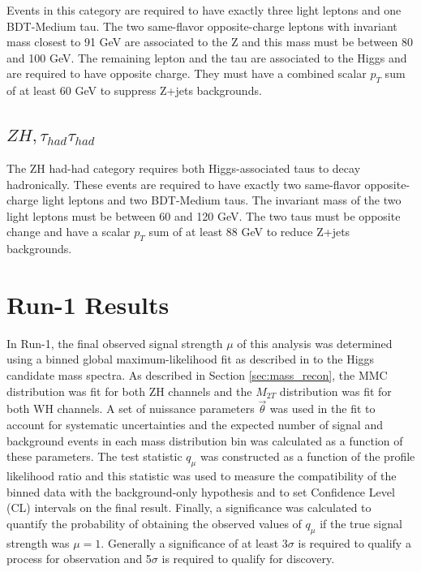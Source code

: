 Events in this category are required to have exactly three light leptons and one BDT-Medium tau. The two same-flavor opposite-charge leptons with invariant mass closest to 91 GeV are associated to the Z and this mass must be between 80 and 100 GeV. The remaining lepton and the tau are associated to the Higgs and are required to have opposite charge. They must have a combined scalar $p_T$ sum of at least 60 GeV to suppress Z+jets backgrounds.  

\subsection{$ZH,\tau_{had}\tau_{had}$}
The ZH had-had category requires both Higgs-associated taus to decay hadronically. These events are required to have exactly two same-flavor opposite-charge light leptons and two BDT-Medium taus. The invariant mass of the two light leptons must be between 60 and 120 GeV. The two taus must be opposite change and have a scalar $p_T$ sum of at least 88 GeV to reduce Z+jets backgrounds. 

\section{Run-1 Results}\label{sec:run1}
In Run-1, the final observed signal strength $\mu$ of this analysis was determined using a binned global maximum-likelihood fit as described in \cite{lh_fit_method_paper} to the Higgs candidate mass spectra. As described in Section \ref{sec:mass_recon}, the MMC distribution was fit for both ZH channels and the $M_{2T}$ distribution was fit for both WH channels. A set of nuissance parameters $\Vec{\theta}$ was used in the fit to account for systematic uncertainties and the expected number of signal and background events in each mass distribution bin was calculated as a function of these parameters. The test statistic $q_{\mu}$ was constructed as a function of the profile likelihood ratio and this statistic was used to measure the compatibility of the binned data with the background-only hypothesis and to set Confidence Level (CL) intervals on the final result. Finally, a significance was calculated to quantify the probability of obtaining the observed values of $q_{\mu}$ if the true signal strength was $\mu=1$. Generally a significance of at least 3$\sigma$ is required to qualify a process for observation and 5$\sigma$ is required to qualify for discovery.\\

